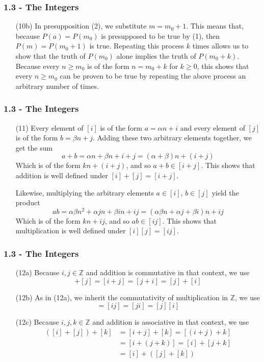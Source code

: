 \documentclass{beamer}
\begin{document}
\begin{frame}
\frametitle{1.3 - The Integers}
\small
\begin{enumerate}
	\item[(10b)] In presupposition (2), we substitute $m = m_0+1$. This means that, because $P(a) = P(m_0)$ is presupposed to be true by (1), then $P(m) = P(m_0 + 1)$ is true. Repeating this process $k$ times allows us to show that the truth of $P(m_0)$ alone implies the truth of $P(m_0 + k)$. Because every $n \geq m_0$ is of the form $n = m_0 + k$ for $k \geq 0$, this shows that every $n\geq m_0$ can be proven to be true by repeating the above process an arbitrary number of times.
\end{enumerate}
\end{frame}
\begin{frame}
\frametitle{1.3 - The Integers}
\small
\begin{enumerate}
	\item[(11)] \quad Every element of $[i]$ is of the form $a = \alpha n + i$ and every element of $[j]$ is of the form $b = \beta n + j$. Adding these two arbitrary elements together, we get the sum 
	\begin{equation*}	
	a+b = \alpha n + \beta n + i + j = (\alpha + \beta)n + (i + j)
	\end{equation*}
	Which is of the form $kn + (i + j)$, and so $a + b \in [i + j]$. This shows that addition is well defined under $[i] + [j] = [i + j]$. 
	
	\quad Likewise, multiplying the arbitrary elements $a\in [i]$, $b\in [j]$ yield the product
	\begin{equation*}
	ab = \alpha \beta n^2 + \alpha j n + \beta i n + ij = (\alpha\beta n + \alpha j + \beta i)n + ij
	\end{equation*}
	Which is of the form $kn + ij$, and so $ab\in [ij]$. This shows that multiplication is well defined under $[i][j] = [ij]$.
\end{enumerate}
\end{frame}
\begin{frame}
\frametitle{1.3 - The Integers}
\small
\begin{enumerate}
	\item[(12a)] Because $i,j \in \mathbb Z$ and addition is commutative in that context, we use
	\begin{equation*}
	[i] + [j] = [i + j] = [j + i] = [j] + [i]
	\end{equation*}
	\item[(12b)] As in (12a), we inherit the commutativity of multiplication in $\mathbb Z$, we use
	\begin{equation*}
	[i][j] = [ij] = [ji] = [j][i]
	\end{equation*}
	\item[(12c)] Because $i,j,k\in\mathbb Z$ and addition is associative in that context, we use
	\begin{align*}
	\left([i] + [j]\right) + [k] &= [i+j] + [k] = [(i + j) + k] \\
	&= [i + (j + k)] = [i] + [j+k] \\
	&= [i] + \left([j] + [k]\right)
	\end{align*}
\end{enumerate}
\end{frame}
\end{document}

